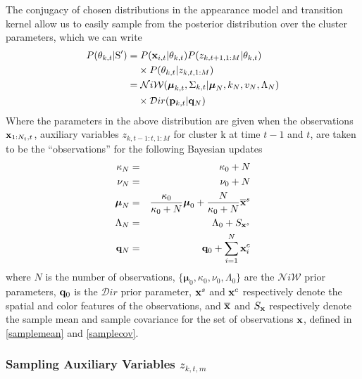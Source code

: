 \documentclass[twocolumn, final]{svjour3}
\begin{document}
The conjugacy of chosen distributions in the appearance model and transition kernel allow us to easily sample from the posterior distribution over the cluster parameters, which we can write
\begin{align}
\begin{split}
P(\theta_{k,t} | \text{S}') = & \hspace{1mm} P(\bold{x}_{i,t} | \theta_{k,t}) P(z_{k,t+1,1:M} | \theta_{k,t})
\\ & \times P(\theta_{k,t} | z_{k,t,1:M}) \\
 = & \hspace{1mm} \mathcal{N}i\mathcal{W}(\boldsymbol{\mu}_{k,t}, \Sigma_{k,t} | \boldsymbol{\mu}_{N}, k_{N}, v_{N}, \Lambda_{N}) \\
  & \times \mathcal{D}ir( \bold{p}_{k,t} | \bold{q}_{N})
\end{split}
\end{align}
Where the parameters in the above distribution are given when the observations $\bold{x}_{1:N_{t},t}$, auxiliary variables $z_{k,t-1:t,1:M}$ for cluster k at time $t-1$ and $t$, are taken to be the ``observations'' for the following Bayesian updates
\begin{eqnarray}
\label{bayesian_update_1}
\kappa_{N} &=& \kappa_{0} + N \\
\label{bayesian_update_2}
\nu_{N} &=& \nu_{0} + N \\
\label{bayesian_update_3}
\boldsymbol{\mu}_{N} &=& \frac{\kappa_{0}}{\kappa_{0}+N} \boldsymbol{\mu}_{0}  +  \frac{N}{\kappa_{0}+N} \overline{\bold{x}}^{s}\\
\Lambda_{N} &=& \Lambda_{0} + S_{\bold{x}^{s}}\\
\label{bayesian_update_4}
\bold{q}_{N} &=& \bold{q}_{0} + \sum_{i=1}^{N} \bold{x}_{i}^{c}
\end{eqnarray}
where $N$ is the number of observations, $\{ \boldsymbol{\mu}_{0}, \kappa_{0}, \nu_{0}, \Lambda_{0} \}$ are the $\mathcal{N}i\mathcal{W}$ prior parameters, $\bold{q}_{0}$ is the $\mathcal{D}ir$ prior parameter, $\bold{x}^{s}$ and $\bold{x}^{c}$ respectively denote the spatial and color features of the observations, and $\overline{\bold{x}}$ and $S_{\bold{x}}$ respectively denote the sample mean and sample covariance for the set of observations $\bold{x}$, defined in \eqref{samplemean} and \eqref{samplecov}.




\subsubsection{Sampling Auxiliary Variables $z_{k,t,m}$}
\label{sec:sample_aux_vars}
\end{document}
